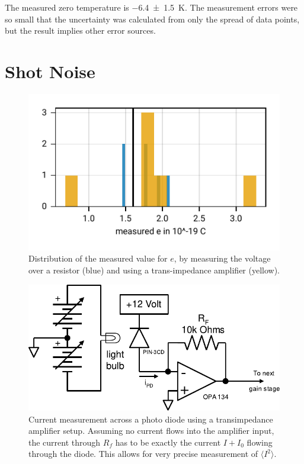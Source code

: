 \documentclass[
    parskip=half, 
    twoside=false,
    twocolumn=true,
    fontsize=11pt,
]{scrarticle}
\begin{document}
The measured zero temperature is \SI{-6.4(15)}{K}. The measurement errors were so small that the uncertainty was calculated from only the spread of data points, but the result implies other error sources.

\section{Shot Noise}
\begin{figure}[h!]
    \centering
    \includegraphics{figures/03 shot noise.pdf}
    \caption{
        Distribution of the measured value for $e$, by measuring the voltage over a resistor (blue) and using a trans-impedance amplifier (yellow).
    }
    \label{fig:shot noise}
\end{figure}
\begin{figure}[h!]
    \centering
    \includegraphics{figures/tamp_schematic.pdf}
    \caption{
        Current measurement across a photo diode using a transimpedance amplifier setup. Assuming no current flows into the amplifier input, the current through $R_f$ has to be exactly the current $I + I_0$ flowing through the diode. This allows for very precise measurement of $\langle I^2 \rangle$.
    }
    \label{fig:transimpedance schematic}
\end{figure}
\end{document}

